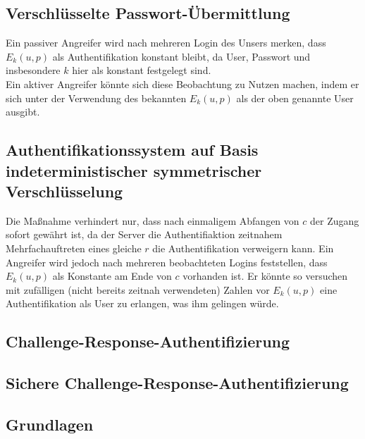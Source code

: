 \documentclass[ngerman]{fbi-aufgabenblatt}
\begin{document}

\subsection{Verschlüsselte Passwort-Übermittlung}
Ein passiver Angreifer wird nach mehreren Login des Unsers merken, dass $E_k(u,p)$ als Authentifikation konstant bleibt, da User, Passwort und insbesondere $k$ hier als konstant festgelegt sind.\\
Ein aktiver Angreifer könnte sich diese Beobachtung zu Nutzen machen, indem er sich unter der Verwendung des bekannten $E_k(u,p)$ als der oben genannte User ausgibt.
\subsection{Authentifikationssystem auf Basis indeterministischer symmetrischer Verschlüsselung}
Die Maßnahme verhindert nur, dass nach einmaligem Abfangen von $c$ der Zugang sofort gewährt ist, da der Server die Authentifiaktion zeitnahem Mehrfachauftreten eines gleiche $r$ die Authentifikation verweigern kann. Ein Angreifer wird jedoch nach mehreren beobachteten Logins feststellen, dass $E_k(u,p)$ als Konstante am Ende von $c$ vorhanden ist. Er könnte so versuchen mit zufälligen (nicht bereits zeitnah verwendeten) Zahlen vor $E_k(u,p)$ eine Authentifikation als User zu erlangen, was ihm gelingen würde.
\subsection{Challenge-Response-Authentifizierung}
\subsection{Sichere Challenge-Response-Authentifizierung}



\subsection{Grundlagen}
\end{document}
